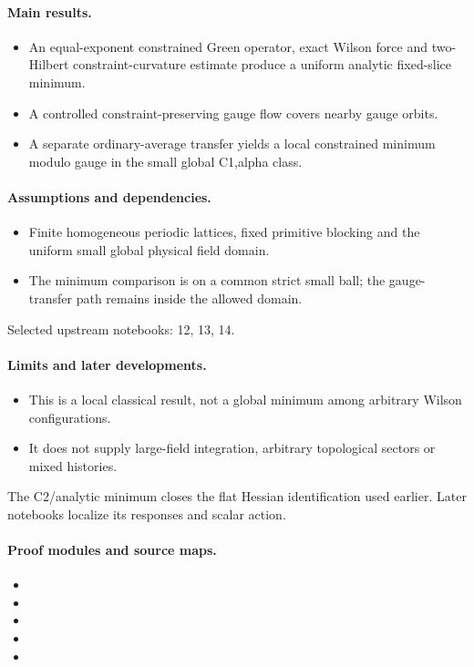 \paragraph{Main results.}
\begin{itemize}
\item An equal-exponent constrained Green operator, exact Wilson force and two-Hilbert constraint-curvature estimate produce a uniform analytic fixed-slice minimum.
\item A controlled constraint-preserving gauge flow covers nearby gauge orbits.
\item A separate ordinary-average transfer yields a local constrained minimum modulo gauge in the small global C1,alpha class.
\end{itemize}

\paragraph{Assumptions and dependencies.}
\begin{itemize}
\item Finite homogeneous periodic lattices, fixed primitive blocking and the uniform small global physical field domain.
\item The minimum comparison is on a common strict small ball; the gauge-transfer path remains inside the allowed domain.
\end{itemize}

Selected upstream notebooks: 12, 13, 14.\par

\paragraph{Limits and later developments.}
\begin{itemize}
\item This is a local classical result, not a global minimum among arbitrary Wilson configurations.
\item It does not supply large-field integration, arbitrary topological sectors or mixed histories.
\end{itemize}

The C2/analytic minimum closes the flat Hessian identification used earlier. Later notebooks localize its responses and scalar action.

\paragraph{Proof modules and source maps.}
\begingroup\small
\begin{itemize}
\item {}
\item {}
\item {}
\item {}
\item {}
\end{itemize}
\endgroup

